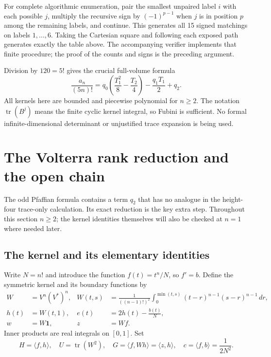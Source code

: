 \documentclass[11pt,letterpaper]{article}
\numberwithin{equation}{section}
\theoremstyle{definition}
\newcommand{\1}{\mathbf 1}
\newcommand{\one}{\mathbf1}
\newcommand{\ip}[2]{\langle #1,#2\rangle}
\DeclareMathOperator{\tr}{tr}
\newcommand{\dd}{\,d}
\begin{document}
For complete algorithmic enumeration, pair the smallest unpaired label
$i$ with each possible $j$, multiply the recursive sign by
$(-1)^{p-1}$ when $j$ is in position $p$ among the remaining labels, and
continue. This generates all 15 signed matchings on labels $1,\ldots,6$.
Taking the Cartesian square and following each exposed path generates
exactly the table above. The accompanying verifier implements that finite
procedure; the proof of the counts and signs is the preceding argument.

Division by $120=5!$ gives the crucial full-volume formula
\begin{equation}
 \boxed{\frac{a_n}{(5n)!}
   =q_0\left(\frac{T_1^2}{8}-\frac{T_2}{4}\right)
       -\frac{q_1T_1}{2}+q_2.}
 \label{shr:h5:eq:pf-volume}
\end{equation}
All kernels here are bounded and piecewise polynomial for $n\ge2$.
The notation $\tr(B^j)$ means the finite cyclic kernel integral, so
Fubini is sufficient. No formal infinite-dimensional determinant or
unjustified trace expansion is being used.

\section{The Volterra rank reduction and the open chain}
\label{shr:h5:sec:rank}
The odd Pfaffian formula contains a term $q_2$ that has no analogue in the
height-four trace-only calculation. Its exact reduction is the key extra
step. Throughout this section $n\ge2$; the kernel identities themselves
will also be checked at $n=1$ where needed later.

\subsection{The kernel and its elementary identities}
Write $N=n!$ and introduce the function $f(t)=t^n/N$, so $f'=b$.
Define the symmetric kernel and its boundary functions by
\begin{align}
 W&=V^n(V^*)^n,&
 W(t,s)&=\frac1{((n-1)!)^2}
   \int_0^{\min(t,s)}(t-r)^{n-1}(s-r)^{n-1}\dd r,\\
 h(t)&=W(t,1),& e(t)&=2h(t)-\frac{b(t)}{N},\\
 w&=W\one,&z&=Wf.
 \label{shr:h5:eq:kernel-defs}
\end{align}
Inner products are real integrals on $[0,1]$. Set
\begin{equation}
 H=\ip f h,\quad U=\tr(W^2),\quad
 G=\ip f{Wh}=\ip z h,\quad c=\ip f b=\frac1{2N^2}.
 \label{shr:h5:eq:HUG}
\end{equation}
\end{document}
